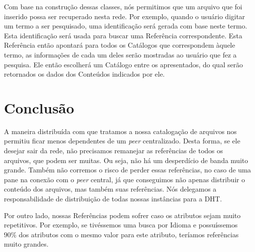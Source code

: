 \documentclass{acm_proc_article-sp}
\begin{document}
Com base na construção dessas classes, nós permitimos que um arquivo que foi inserido possa ser recuperado nesta rede. Por exemplo, quando o usuário digitar um termo a ser pesquisado, uma identificação será gerada com base neste termo. Esta identificação será usada para buscar uma Referência correspondente. Esta Referência então apontará para todos os Catálogos que correspondem àquele termo, as informações de cada um deles serão mostradas ao usuário que fez a pesquisa. Ele então escolherá um Catálogo entre os apresentados, do qual serão retornados os dados dos Conteúdos indicados por ele. 

\section{Conclusão}

A maneira distribuída com que tratamos a nossa catalogação de arquivos nos permitiu ficar menos dependentes de um \textit{peer} centralizado. Desta forma, se ele desejar sair da rede, não precisamos remanejar as referências de todos os arquivos, que podem ser muitas. Ou seja, não há um desperdício de banda muito grande. Também não corremos o risco de perder essas referências, no caso de uma pane na conexão com o \textit{peer} central, já que conseguimos não apenas distribuir o conteúdo dos arquivos, mas também suas referências. Nós delegamos a responsabilidade de distribuição de todas nossas instâncias para a DHT.

Por outro lado, nossas Referências podem sofrer caso os atributos sejam muito repetitivos. Por exemplo, se tivéssemos uma busca por Idioma e possuíssemos $90\%$ dos atributos com o mesmo valor para este atributo, teríamos referências muito grandes.



\end{document}
